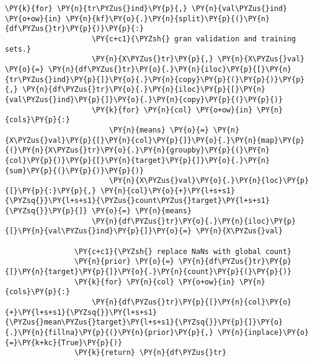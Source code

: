 \begin{Verbatim}[commandchars=\\\{\}]
                \PY{k}{for} \PY{n}{tr\PYZus{}ind}\PY{p}{,} \PY{n}{val\PYZus{}ind} \PY{o+ow}{in} \PY{n}{kf}\PY{o}{.}\PY{n}{split}\PY{p}{(}\PY{n}{df\PYZus{}tr}\PY{p}{)}\PY{p}{:}
                    \PY{c+c1}{\PYZsh{} gran validation and training sets.}
                    \PY{n}{X\PYZus{}tr}\PY{p}{,} \PY{n}{X\PYZus{}val} \PY{o}{=} \PY{n}{df\PYZus{}tr}\PY{o}{.}\PY{n}{iloc}\PY{p}{[}\PY{n}{tr\PYZus{}ind}\PY{p}{]}\PY{o}{.}\PY{n}{copy}\PY{p}{(}\PY{p}{)}\PY{p}{,} \PY{n}{df\PYZus{}tr}\PY{o}{.}\PY{n}{iloc}\PY{p}{[}\PY{n}{val\PYZus{}ind}\PY{p}{]}\PY{o}{.}\PY{n}{copy}\PY{p}{(}\PY{p}{)}
                    \PY{k}{for} \PY{n}{col} \PY{o+ow}{in} \PY{n}{cols}\PY{p}{:}
                        \PY{n}{means} \PY{o}{=} \PY{n}{X\PYZus{}val}\PY{p}{[}\PY{n}{col}\PY{p}{]}\PY{o}{.}\PY{n}{map}\PY{p}{(}\PY{n}{X\PYZus{}tr}\PY{o}{.}\PY{n}{groupby}\PY{p}{(}\PY{n}{col}\PY{p}{)}\PY{p}{[}\PY{n}{target}\PY{p}{]}\PY{o}{.}\PY{n}{sum}\PY{p}{(}\PY{p}{)}\PY{p}{)}
                        \PY{n}{X\PYZus{}val}\PY{o}{.}\PY{n}{loc}\PY{p}{[}\PY{p}{:}\PY{p}{,} \PY{n}{col}\PY{o}{+}\PY{l+s+s1}{\PYZsq{}}\PY{l+s+s1}{\PYZus{}count\PYZus{}target}\PY{l+s+s1}{\PYZsq{}}\PY{p}{]} \PY{o}{=} \PY{n}{means}
                    \PY{n}{df\PYZus{}tr}\PY{o}{.}\PY{n}{iloc}\PY{p}{[}\PY{n}{val\PYZus{}ind}\PY{p}{]}\PY{o}{=} \PY{n}{X\PYZus{}val}
        
                \PY{c+c1}{\PYZsh{} replace NaNs with global count}
                \PY{n}{prior} \PY{o}{=} \PY{n}{df\PYZus{}tr}\PY{p}{[}\PY{n}{target}\PY{p}{]}\PY{o}{.}\PY{n}{count}\PY{p}{(}\PY{p}{)}
                \PY{k}{for} \PY{n}{col} \PY{o+ow}{in} \PY{n}{cols}\PY{p}{:}
                    \PY{n}{df\PYZus{}tr}\PY{p}{[}\PY{n}{col}\PY{o}{+}\PY{l+s+s1}{\PYZsq{}}\PY{l+s+s1}{\PYZus{}mean\PYZus{}target}\PY{l+s+s1}{\PYZsq{}}\PY{p}{]}\PY{o}{.}\PY{n}{fillna}\PY{p}{(}\PY{n}{prior}\PY{p}{,} \PY{n}{inplace}\PY{o}{=}\PY{k+kc}{True}\PY{p}{)}
                \PY{k}{return} \PY{n}{df\PYZus{}tr}
\end{Verbatim}


